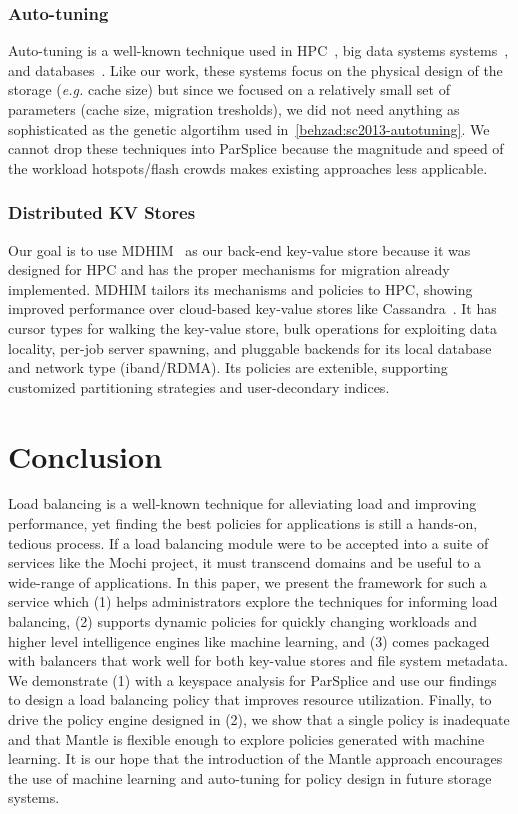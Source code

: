 \subsubsection*{Auto-tuning} Auto-tuning is a well-known technique used in
HPC~\cite{behzad:sc2013-autotuning, behzad:techreport2014-io-autotuning}, big
data systems systems~\cite{herodotou_starfish_2011}, and
databases~\cite{schnaitter_index_2009}.  Like our work, these systems focus on
the physical design of the storage ({\it e.g.} cache size) but since we focused
on a relatively small set of parameters (cache size, migration tresholds), we
did not need anything as sophisticated as the genetic algortihm used
in~\ref{behzad:sc2013-autotuning}.  We cannot drop these techniques into
ParSplice because the magnitude and speed of the workload hotspots/flash crowds
makes existing approaches less applicable. 

\subsubsection*{Distributed KV Stores}

Our goal is to use MDHIM~\cite{greenberg:hotstorage2015-mdhim} as our back-end
key-value store because it was designed for HPC and has the proper mechanisms
for migration already implemented.  MDHIM tailors its mechanisms and policies
to HPC, showing improved performance over cloud-based key-value stores like
Cassandra~\cite{lakshman_cassandra_2010}. It has cursor types for walking the
key-value store, bulk operations for exploiting data locality, per-job server
spawning, and pluggable backends for its local database and network type
(iband/RDMA). Its policies are extenible, supporting customized partitioning
strategies and user-decondary indices.

\section{Conclusion}

Load balancing is a well-known technique for alleviating load and improving
performance, yet finding the best policies for applications is still a
hands-on, tedious process. If a load balancing module were to be accepted into
a suite of services like the Mochi project, it must transcend domains and be
useful to a wide-range of applications. In this paper, we present the framework
for such a service which (1) helps administrators explore the techniques for
informing load balancing, (2) supports dynamic policies for quickly changing
workloads and higher level intelligence engines like machine learning, and (3)
comes packaged with balancers that work well for both key-value stores and file
system metadata. We demonstrate (1) with a keyspace analysis for ParSplice and
use our findings to design a load balancing policy that improves resource
utilization.  Finally, to drive the policy engine designed in (2), we show that
a single policy is inadequate and that Mantle is flexible enough to explore
policies generated with machine learning. It is our hope that the introduction
of the Mantle approach encourages the use of machine learning and auto-tuning
for policy design in future storage systems.
